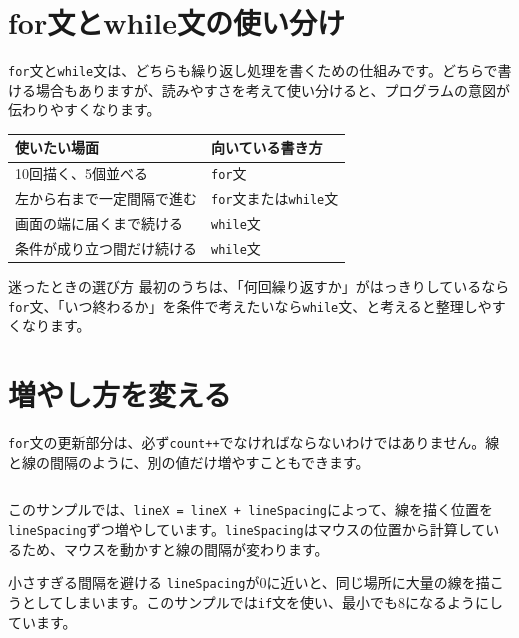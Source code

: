 \section{for文とwhile文の使い分け}

\texttt{for}文と\texttt{while}文は、どちらも繰り返し処理を書くための仕組みです。どちらで書ける場合もありますが、読みやすさを考えて使い分けると、プログラムの意図が伝わりやすくなります。

\begin{center}
\begin{tabular}{ll}
\toprule
使いたい場面 & 向いている書き方 \\
\midrule
10回描く、5個並べる & \texttt{for}文 \\
左から右まで一定間隔で進む & \texttt{for}文または\texttt{while}文 \\
画面の端に届くまで続ける & \texttt{while}文 \\
条件が成り立つ間だけ続ける & \texttt{while}文 \\
\bottomrule
\end{tabular}
\end{center}

\begin{notebox}{迷ったときの選び方}
最初のうちは、「何回繰り返すか」がはっきりしているなら\texttt{for}文、「いつ終わるか」を条件で考えたいなら\texttt{while}文、と考えると整理しやすくなります。
\end{notebox}

\section{増やし方を変える}

\texttt{for}文の更新部分は、必ず\texttt{count++}でなければならないわけではありません。線と線の間隔のように、別の値だけ増やすこともできます。

\begin{listing}[htbp]
\inputminted{ts}{typescript-p5/listings/chapter07/for-with-step.ts}
\caption{for文の更新量を変える（\texttt{chapter07/for-with-step.ts}）}
\label{lst:chapter07-for-with-step}
\end{listing}

このサンプルでは、\texttt{lineX = lineX + lineSpacing}によって、線を描く位置を\texttt{lineSpacing}ずつ増やしています。\texttt{lineSpacing}はマウスの位置から計算しているため、マウスを動かすと線の間隔が変わります。

\begin{notebox}{小さすぎる間隔を避ける}
\texttt{lineSpacing}が0に近いと、同じ場所に大量の線を描こうとしてしまいます。このサンプルでは\texttt{if}文を使い、最小でも8になるようにしています。
\end{notebox}


